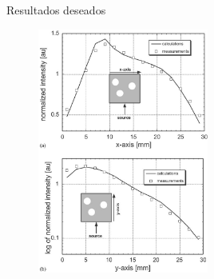 \documentclass[10pt]{beamer}
\begin{document}

\begin{frame}[fragile]{Resultados deseados}

\begin{figure}
 \includegraphics[width=0.5\textwidth]{resultado.png}
\end{figure}

\end{frame}


% 
% 
% 

\end{document}

